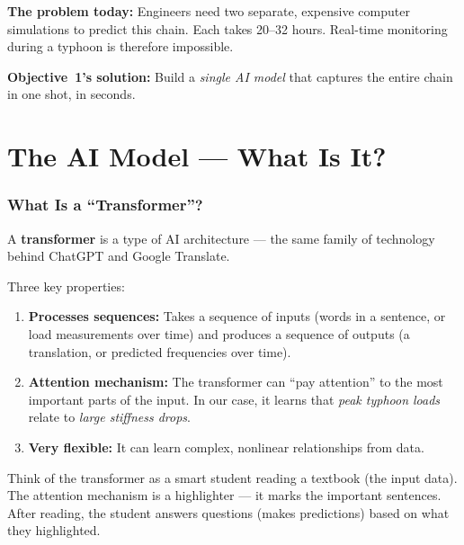 \documentclass[11pt,a4paper]{article}
\begin{document}
\textbf{The problem today:} Engineers need two separate, expensive computer
simulations to predict this chain.  Each takes 20--32 hours.  Real-time
monitoring during a typhoon is therefore impossible.

\textbf{Objective~1's solution:} Build a \textit{single AI model} that
captures the entire chain in one shot, in seconds.


\newpage
\part{The AI Model --- What Is It?}

\section{What Is a ``Transformer''?}

A \textbf{transformer} is a type of AI architecture --- the same family of
technology behind ChatGPT and Google Translate.

Three key properties:
\begin{enumerate}
  \item \textbf{Processes sequences:} Takes a sequence of inputs (words in a
        sentence, or load measurements over time) and produces a sequence of
        outputs (a translation, or predicted frequencies over time).
  \item \textbf{Attention mechanism:} The transformer can ``pay attention'' to
        the most important parts of the input.  In our case, it learns that
        \textit{peak typhoon loads} relate to \textit{large stiffness drops}.
  \item \textbf{Very flexible:} It can learn complex, nonlinear relationships
        from data.
\end{enumerate}

\begin{tcolorbox}[colback=yellow!5, colframe=yellow!50!black, title=Analogy]
Think of the transformer as a smart student reading a textbook (the input
data).  The attention mechanism is a highlighter --- it marks the important
sentences.  After reading, the student answers questions (makes predictions)
based on what they highlighted.
\end{tcolorbox}
\end{document}
